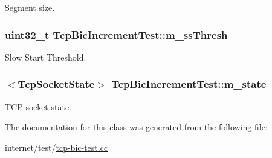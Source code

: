 Segment size. 

\subsubsection[{\texorpdfstring{m\+\_\+ss\+Thresh}{m_ssThresh}}]{\setlength{\rightskip}{0pt plus 5cm}uint32\+\_\+t Tcp\+Bic\+Increment\+Test\+::m\+\_\+ss\+Thresh\hspace{0.3cm}{\ttfamily [private]}}\hypertarget{classTcpBicIncrementTest_a9c70339d86bc09924c92a65c2d2fcc00}{}\label{classTcpBicIncrementTest_a9c70339d86bc09924c92a65c2d2fcc00}


Slow Start Threshold. 

\subsubsection[{\texorpdfstring{m\+\_\+state}{m_state}}]{$<${\bf Tcp\+Socket\+State}$>$ Tcp\+Bic\+Increment\+Test\+::m\+\_\+state\hspace{0.3cm}{\ttfamily [private]}}\hypertarget{classTcpBicIncrementTest_ad536c9ce669c8e9a264f8ac4c8937f7f}{}\label{classTcpBicIncrementTest_ad536c9ce669c8e9a264f8ac4c8937f7f}


T\+CP socket state. 



The documentation for this class was generated from the following file\+:\begin{DoxyCompactItemize}
\item 
internet/test/\hyperlink{tcp-bic-test_8cc}{tcp-\/bic-\/test.\+cc}\end{DoxyCompactItemize}
